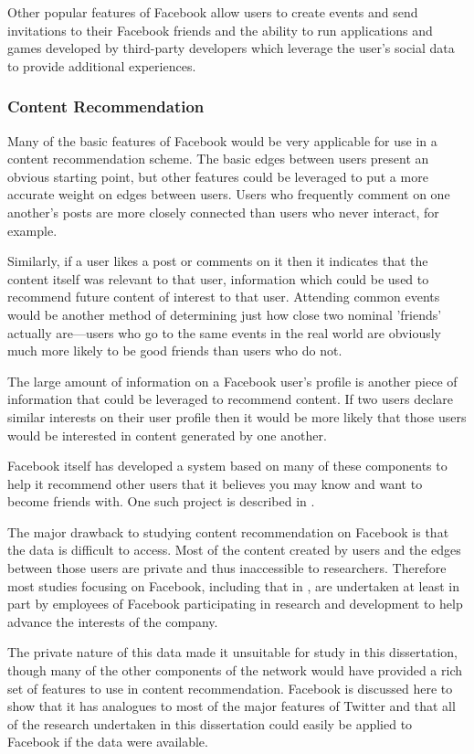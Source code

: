 Other popular features of Facebook allow users to create events and send invitations to their Facebook friends and the ability to run applications and games developed by third-party developers which leverage the user's social data to provide additional experiences.

\subsubsection{Content Recommendation}
\label{sec:FbContentRec}

Many of the basic features of Facebook would be very applicable for use in a content recommendation scheme. The basic edges between users present an obvious starting point, but other features could be leveraged to put a more accurate weight on edges between users. Users who frequently comment on one another's posts are more closely connected than users who never interact, for example.

Similarly, if a user likes a post or comments on it then it indicates that the content itself was relevant to that user, information which could be used to recommend future content of interest to that user. Attending common events would be another method of determining just how close two nominal 'friends' actually are---users who go to the same events in the real world are obviously much more likely to be good friends than users who do not.

The large amount of information on a Facebook user's profile is another piece of information that could be leveraged to recommend content. If two users declare similar interests on their user profile then it would be more likely that those users would be interested in content generated by one another.

Facebook itself has developed a system based on many of these components to help it recommend other users that it believes you may know and want to become friends with. One such project is described in \cite{Backstrom2011}.

The major drawback to studying content recommendation on Facebook is that the data is difficult to access. Most of the content created by users and the edges between those users are private and thus inaccessible to researchers. Therefore most studies focusing on Facebook, including that in \cite{Backstrom2011}, are undertaken at least in part by employees of Facebook participating in research and development to help advance the interests of the company.

The private nature of this data made it unsuitable for study in this dissertation, though many of the other components of the network would have provided a rich set of features to use in content recommendation. Facebook is discussed here to show that it has analogues to most of the major features of Twitter and that all of the research undertaken in this dissertation could easily be applied to Facebook if the data were available.

